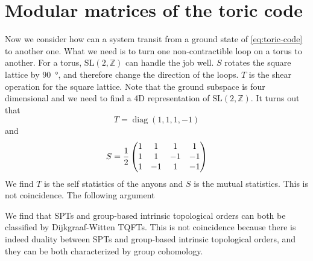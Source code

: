 \documentclass[hyperref, a4paper]{article}
\DeclareMathOperator{\diag}{diag}
\begin{document}
\section{Modular matrices of the toric code}

Now we consider how can a system transit from a ground state of \eqref{eq:toric-code} to another one.
What we need is to turn one non-contractible loop on a torus to another.
For a torus, $\mathrm{SL}(2, \mathbb{Z})$ can handle the job well.
$S$ rotates the square lattice by \SI{90}{\degree}, and therefore change the direction of the loops.
$T$ is the shear operation for the square lattice.
Note that the ground subspace is four dimensional and we need to find a 4D representation of $\mathrm{SL}(2, \mathbb{Z})$.
It turns out that 
\begin{equation}
    T = \diag(1, 1, 1, -1)
\end{equation}
and 
\begin{equation}
    S = \frac{1}{2} \pmqty{1 & 1 & 1 & 1 \\ 1 & 1 & -1 & -1 \\ 1 & -1 & 1 & -1 \\ }
\end{equation}
We find $T$ is the self statistics of the anyons and $S$ is the mutual statistics.
This is not coincidence. The following argument %

We find that SPTs and group-based intrinsic topological orders can both be classified by Dijkgraaf-Witten TQFTs.
This is not coincidence because there is indeed duality between SPTs and group-based intrinsic topological orders, and they can be both characterized by group cohomology.
\end{document}
